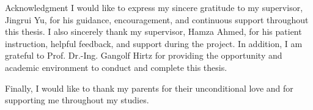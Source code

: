 \vspace*{0pt plus 1fill}
\begin{tucsimplesection}{Acknowledgment}
I would like to express my sincere gratitude to my supervisor, Jingrui Yu, for his guidance,
encouragement, and continuous support throughout this thesis. I also sincerely thank my
supervisor, Hamza Ahmed, for his patient instruction, helpful feedback, and support during
the project. In addition, I am grateful to Prof. Dr.-Ing. Gangolf Hirtz for providing the
opportunity and academic environment to conduct and complete this thesis.

Finally, I would like to thank my parents for their unconditional love and for supporting me
throughout my studies.
\end{tucsimplesection}
\vspace*{0pt plus 2.5fill}
